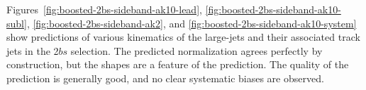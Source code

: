 Figures~\ref{fig:boosted-2bs-sideband-ak10-lead}, \ref{fig:boosted-2bs-sideband-ak10-subl}, \ref{fig:boosted-2bs-sideband-ak2},  and \ref{fig:boosted-2bs-sideband-ak10-system} show predictions of various kinematics of the large-\R jets and their associated track jets in the 2$bs$ selection. The predicted normalization agrees perfectly by construction, but the shapes are a feature of the prediction. The quality of the prediction is generally good, and no clear systematic biases are observed.


